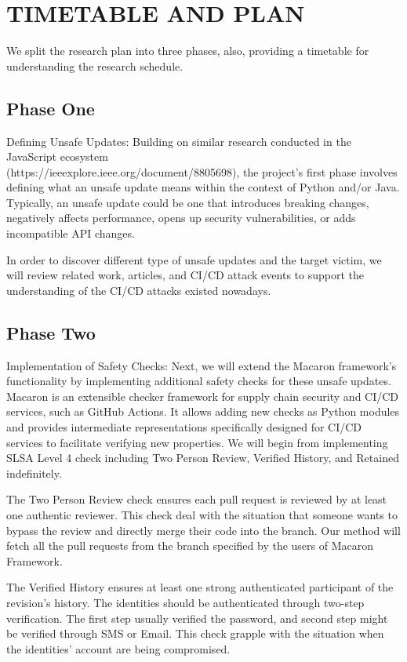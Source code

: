 \section{TIMETABLE AND PLAN}
We split the research plan into three phases, also, providing a timetable for understanding 
the research schedule.

\subsection{Phase One}
Defining Unsafe Updates: Building on similar research conducted in the JavaScript ecosystem 
\\(https://ieeexplore.ieee.org/document/8805698), the project's first phase 
involves defining what an unsafe update means within the context of Python and/or Java. 
Typically, an unsafe update could be one that introduces breaking changes, 
negatively affects performance, opens up security vulnerabilities, 
or adds incompatible API changes.

In order to discover different type of unsafe updates and the target victim, we will review 
related work, articles, and CI/CD attack events to support the understanding of the CI/CD 
attacks existed nowadays. 

\subsection{Phase Two}
Implementation of Safety Checks: Next, we will extend the Macaron framework's 
functionality by implementing additional safety checks for these unsafe updates.
Macaron is an extensible checker framework for supply chain security and CI/CD services,
such as GitHub Actions. It allows adding new checks as Python modules and provides 
intermediate representations specifically designed for CI/CD services to facilitate 
verifying new properties. We will begin from implementing SLSA Level 4 check including Two 
Person Review, Verified History, and Retained indefinitely.

The Two Person Review check ensures each pull request is reviewed by at least one authentic reviewer.
This check deal with the situation that someone wants to bypass the review and directly merge 
their code into the branch. Our method will fetch all the pull requests from the branch 
specified by the users of Macaron Framework.

The Verified History ensures at least one strong authenticated participant of the revision's history.
The identities should be authenticated through two-step verification. The first step usually 
verified the password, and second step might be verified through SMS or Email. This check grapple
with the situation when the identities' account are being compromised.

